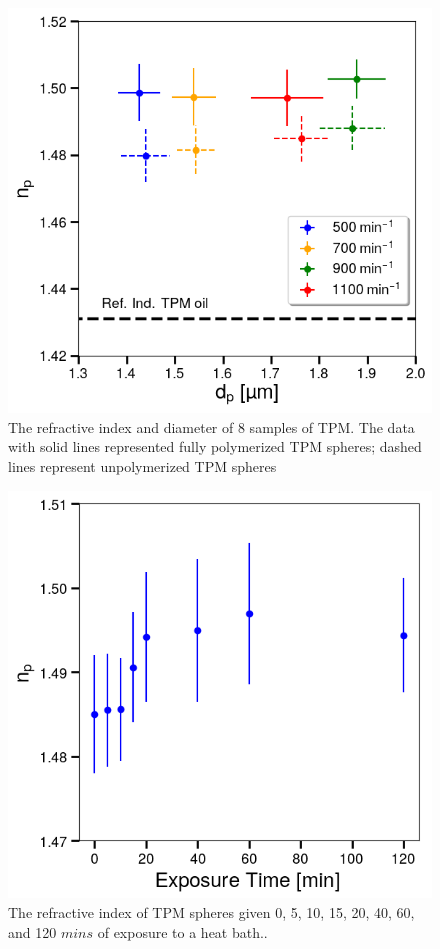 \begin{figure}
    \centering
    \includegraphics[width=0.75\columnwidth]{figures/may_data_stirring_both}
    \caption{The refractive index and diameter of 8 samples of TPM. The data with solid lines represented fully  polymerized TPM spheres; dashed lines represent 
    unpolymerized TPM spheres}
    \label{fig:stir_rate}
\end{figure}

\begin{figure}
    \centering
    \includegraphics[width=0.75\columnwidth]{figures/may_data_heat_bath_time.png}
    \caption{The refractive index of TPM spheres
    given \num{0}, \num{5}, \num{10}, \num{15}, 
    \num{20}, \num{40}, \num{60}, and \num{120} $\si{mins}$ of exposure to a heat bath..}
    \label{fig:heat_bath}
\end{figure}

